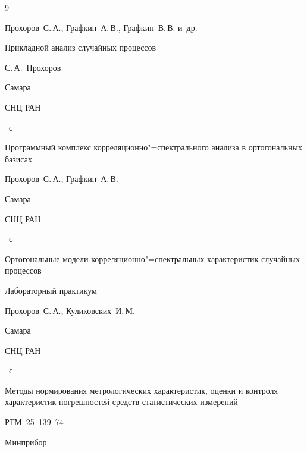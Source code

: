 \vspace{5mm}





\begin{thebibliography}{9}


\by Прохоров~С.\,А., Графкин~А.\,В., Графкин~В.\,В. и~др.

\book Прикладной анализ случайных процессов

\ed С.\,А.~Прохоров

\publaddr Самара

\publ СНЦ РАН


~с





\book Программный комплекс корреляционно"=спектрального анализа в ортогональных базисах

\by Прохоров~С.\,А., Графкин~А.\,В.

\publaddr Самара

\publ СНЦ РАН


~с





\book Ортогональные модели корреляционно"=спектральных характеристик случайных процессов

\bookinfo Лабораторный практикум

\by Прохоров~С.\,А., Куликовских~И.\,М.

\publaddr Самара

\publ СНЦ РАН


~с





\book Методы нормирования метрологических характеристик, оценки и контроля характеристик погрешностей средств статистических измерений

\bookinfo РТМ~25~139--74

\publ Минприбор


\end{thebibliography}
